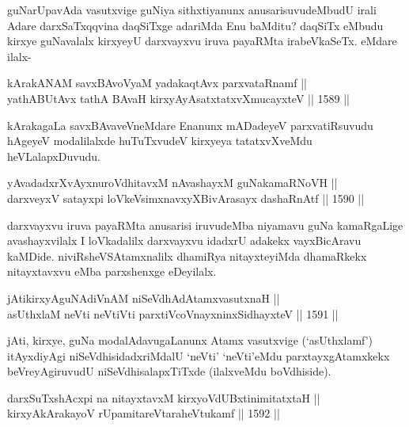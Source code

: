\begin{artha}
guNarUpavAda vasutxvige guNiya sithxtiyanunx anusarisuvudeMbudU irali Adare darxSaTxqqvina daqSiTxge adariMda Enu baMditu? daqSiTx eMbudu kirxye guNavalalx kirxyeyU darxvayxvu iruva payaRMta irabeVkaSeTx. eMdare ilalx-
\end{artha}

\begin{shl}
kArakANAM savxBAvoV\s yaM yadakaqtAvx parxvataRnamf || \\
yathA\s BUtAvx tathA BAvaH kirxyAyAsatxtatxvXmucayxteV \hfill || 1589 ||  
\end{shl}

\begin{artha}
kArakagaLa savxBAvaveVneMdare Enanunx mADadeyeV parxvatiRsuvudu hAgeyeV modalilalxde huTuTxvudeV kirxyeya tatatxvXveMdu heVLalapxDuvudu.
\end{artha}

\begin{shl}
yAvadadxrXvAyxnuroVdhitavxM nAvashayxM guNakamaRNoVH || \\
darxveyxV satayxpi loVkeV\s simxnavxyXBivArasayx dashaRnAtf \hfill || 1590 ||  
\end{shl}

\begin{artha}
darxvayxvu iruva payaRMta anusarisi iruvudeMba niyamavu guNa kamaRgaLige avashayxvilalx I loVkadalilx darxvayxvu idadxrU adakekx vayxBicAravu kaMDide. niviRsheVSAtamxnalilx dhamiRya nitayxteyiMda dhamaRkekx nitayxtavxvu eMba parxshenxge eDeyilalx.
\end{artha}

\begin{shl}
jAtikirxyAguNAdiVnAM niSeVdhAdAtamxvasutxnaH || \\
asUthxlaM neVti neVtiVti parxtiVcoV\s nayxninxSidhayxteV \hfill || 1591 || 
\end{shl}

\begin{artha}
jAti, kirxye, guNa modalAdavugaLanunx Atamx vasutxvige (`asUthxlamf') itAyxdiyAgi niSeVdhisidadxriMdalU `neVti' `neVti'eMdu parxtayxgAtamxkekx beVreyAgiruvudU niSeVdhisalapxTiTxde (ilalxveMdu boVdhiside).
\end{artha}


\begin{shl}
darxSuTxshAcxpi na nitayxtavxM kirxyoVdUBxtinimitatxtaH || \\
kirxyAkArakayoV rUpamitareVtaraheVtukamf \hfill || 1592 ||  
\end{shl}

